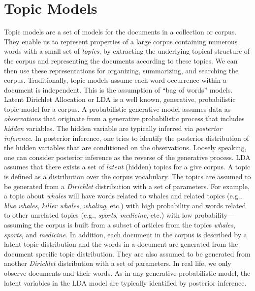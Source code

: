 \section{Topic Models}


Topic models are a set of models for the documents in a collection 
or corpus. They enable us to represent properties of a large 
corpus containing numerous words with a small set of \textsl{topics}, 
by extracting the underlying topical structure of the corpus and 
representing the documents according to these topics. We can then 
use these representations for organizing, summarizing, and searching 
the corpus. Traditionally, topic models assume each word occurrence 
within a document is independent. This is the assumption of ``bag of 
words'' models. Latent Dirichlet Allocation or LDA 
\cite{Blei2003} is a well known, generative, probabilistic   
topic model for a corpus. A probabilistic generative model assumes 
data as \textsl{observations} that originate from a generative 
probabilistic process that includes \textsl{hidden} variables. The 
hidden variable are typically inferred via \textsl{posterior 
inference}. In posterior inference, one tries to identify the posterior 
distribution of the hidden variables that are conditioned on the observations. 
Loosely speaking, one can consider posterior inference as the 
reverse of the generative process. LDA assumes 
that there exists a set of \textsl{latent} (hidden) topics for a 
give corpus. A topic is defined as a distribution over the corpus 
vocabulary. The topics are assumed to be generated from a 
\textsl{Dirichlet} distribution with a set of parameters. For 
example, a topic about \textit{whales} will have words related to 
whales and related topics (e.g., \textit{blue whales}, \textit{killer whales}, 
\textit{whaling}, etc.) with high probability and words related to 
other unrelated topics (e.g., \textit{sports}, \textit{medicine}, 
etc.) with low probability---assuming the corpus is built from a 
subset of articles from the topics \textit{whales}, \textit{sports}, and 
\textit{medicine}. In addition, each document in the corpus is 
described by a latent topic distribution and the words in a document 
are generated from the document specific topic distribution. They 
are also assumed to be generated from another \textsl{Dirichlet} 
distribution with a set of parameters. In real life, we only observe 
documents and their words. As in any generative probabilistic model, 
the latent variables in the LDA model are typically identified by 
posterior inference. 

